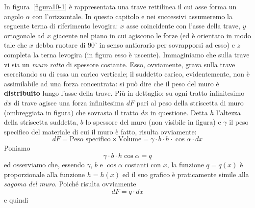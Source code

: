 In figura~\ref{figura10-1} è rappresentata una trave rettilinea il cui asse forma un angolo $\alpha$ con l'orizzontale. In questo capitolo e nei successivi assumeremo la seguente terna di riferimento levogira: $x$ asse coincidente con l'asse della trave, $y$ ortogonale ad $x$ giacente nel piano in cui agiscono le forze (ed è orientato in modo tale che $x$ debba ruotare di $90^{\circ}$ in senso antiorario per sovrapporsi ad esso) e $z$ completa la terna levogira (in figura esso è uscente). Immaginiamo che sulla trave vi sia un \emph{muro rotto} di spessore costante. Esso, ovviamente, grava sulla trave esercitando su di essa un carico verticale; il suddetto carico, evidentemente, non è assimilabile ad una forza concentrata: si può dire che il peso del muro è \textbf{distribuito} lungo l'asse della trave. Più in dettaglio: su ogni tratto infinitesimo $dx$ di trave agisce una forza infinitesima $dF$ pari al peso della striscetta di muro (ombreggiata in figura) che sovrasta il tratto $dx$ in questione. Detta $h$ l'altezza della striscetta suddetta, $b$ lo spessore del muro (non visibile in figura) e $\gamma$ il peso specifico del materiale di cui il muro è fatto, risulta ovviamente:
\begin{equation} \label{equazione10-1}
dF = \text{Peso specifico} \times \text{Volume} = \gamma\cdot b\cdot h\cdot \cos{\alpha}\cdot dx \tag{10.1}
\end{equation}
Poniamo 
\begin{equation*}
\boxed{\gamma \cdot b \cdot h \cos{\alpha} = q}
\end{equation*}
ed osserviamo che, essendo $\gamma$, $b$ e $\cos{\alpha}$ costanti con $x$, la funzione $q = q(x)$ è proporzionale alla funzione $h = h(x)$ ed il suo grafico è praticamente simile alla \emph{sagoma del muro}. Poiché risulta ovviamente 
\begin{equation*}
\boxed{dF = q \cdot dx}
\end{equation*}
e quindi

